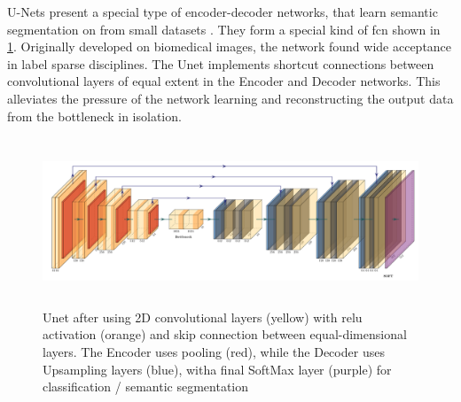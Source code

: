 U-Nets present a special type of encoder-decoder networks, that learn semantic segmentation on from small datasets \citep{ronneberger2015unet}. They form a special kind of \ac{fcn} shown in \cref{fig:unet}. Originally developed on biomedical images, the network found wide acceptance in label sparse disciplines. The Unet implements shortcut connections between convolutional layers of equal extent in the Encoder and Decoder networks. This alleviates the pressure of the network learning and reconstructing the output data from the bottleneck in isolation. 

\begin{figure}[H]
    \centering
    \includegraphics[width=\textwidth,height=5cm,keepaspectratio]{figures/unet.pdf}
    \caption{Unet after \citet{ronneberger2015unet} using 2D convolutional layers (yellow) with \ac{relu} activation (orange) and skip connection between equal-dimensional layers. The Encoder uses pooling (red), while the Decoder uses Upsampling layers (blue), witha final SoftMax layer (purple) for classification / semantic segmentation}
    \label{fig:unet}
\end{figure}